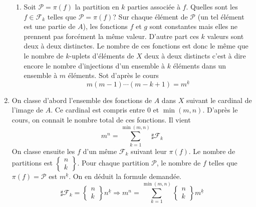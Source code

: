 \begin{enumerate}
\begin{enumerate}
 \item Soit $\mathcal{P} = \pi(f)$ la partition en $k$ parties associée à $f$. Quelles sont les $f\in \mathcal{F}_k$ telles que $\mathcal{P} = \pi(f)$?\newline
 Sur chaque élément de $\mathcal{P}$ (un tel élément est une partie de $A$), les fonctions $f$ et $g$ sont constantes mais elles ne prennent pas forcément la même valeur. D'autre part ces $k$ valeurs sont deux à deux distinctes. Le nombre de ces fonctions est donc le même que le nombre de $k$-uplets d'éléments de $X$ deux à deux distincts c'est à dire encore le nombre d'injections d'un ensemble à $k$ éléments dans un ensemble à $m$ éléments. Sot d'après le cours
\begin{displaymath}
 m(m-1)\cdots(m-k+1) = m^{\underline{k}}
\end{displaymath}
\end{enumerate}

 \item On classe d'abord l'ensemble des fonctions de $A$ dans $X$ suivant le cardinal de l'image de $A$. Ce cardinal est compris entre $0$ et $\min(m,n)$. D'après le cours, on connait le nombre total de ces fonctions. Il vient
\begin{displaymath}
 m^n = \sum_{k=1}^{\min(m,n)}\sharp \mathcal{F}_k
\end{displaymath}
On classe ensuite les $f$ d'un même $\mathcal{F}_k$ suivant leur $\pi(f)$. Le nombre de partitions est $\left\lbrace \begin{matrix} n\\k \end{matrix} \right\rbrace$. Pour chaque partition $\mathcal{P}$, le nombre de $f$ telles que $\pi(f)=\mathcal{P}$ est $m^{\underline{k}}$. On en déduit la formule demandée.
\begin{displaymath}
\sharp \mathcal{F}_k=
 \left\lbrace \begin{matrix} n\\k \end{matrix} \right\rbrace
n^{\underline{k}}
\Rightarrow
m^n = \sum_{k=1}^{\min(m,n)}
\left\lbrace \begin{matrix} n\\k \end{matrix} \right\rbrace m^{\underline{k}}
\end{displaymath}

\end{enumerate}
